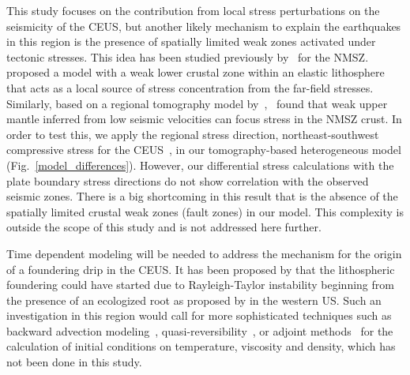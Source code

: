 \documentclass[draft,linenumbers]{agujournal2018}
\begin{document}
 This study focuses on the contribution from local stress perturbations on the seismicity of the CEUS, but another likely mechanism to explain the earthquakes in this region is the presence of spatially limited weak zones activated under tectonic stresses. This idea has been studied previously by~\citet{Kenner_2000a,  zhan2016stress} for the NMSZ.~\citet{Kenner_2000a} proposed a model with a weak lower crustal zone within an elastic lithosphere that acts as a local source of stress concentration from the far-field stresses. Similarly, based on a regional tomography model by~\citet{pollitz2014seismic},~\citet{zhan2016stress} found that weak upper mantle inferred from low seismic velocities can focus stress in the NMSZ crust. In order to test this, we apply the regional stress direction,  northeast-southwest compressive stress for the CEUS~\citep{zoback1989tectonic}, in our tomography-based heterogeneous model (Fig.~\ref{model_differences}). However, our differential stress calculations with the plate boundary stress directions do not show correlation with the observed seismic zones. There is a big shortcoming in this result that is the absence of the spatially limited crustal weak zones (fault zones) in our model. This complexity is outside the scope of this study and is not addressed here further.     
     
Time dependent modeling will be needed to address the mechanism for the origin of a foundering drip in the CEUS. It has been proposed by \cite{Biryol_2016} that the lithospheric foundering could have started due to Rayleigh-Taylor instability beginning from the presence of an ecologized root as proposed by \citet{le2006mantle} in the western US. Such an investigation in this region would call for more sophisticated techniques such as backward advection modeling~\citep[e.g.,][]{conrad2003seismic}, quasi-reversibility~\citep{glivsovic2016new}, or adjoint methods~\citep[e.g.,][]{bunge2003mantle, liu2008reconstructing} for the calculation of initial conditions on temperature, viscosity and density, which has not been done in this study.
\end{document}
